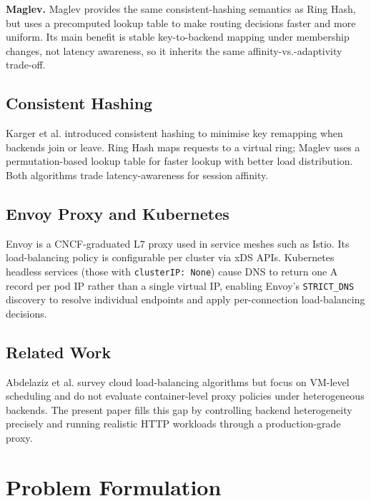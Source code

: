 \documentclass[conference]{IEEEtran}
\begin{document}
\textbf{Maglev.}
Maglev provides the same consistent-hashing semantics as Ring Hash, but uses a
precomputed lookup table to make routing decisions faster and more uniform.
Its main benefit is stable key-to-backend mapping under membership changes, not
latency awareness, so it inherits the same affinity-vs.-adaptivity trade-off.

\subsection{Consistent Hashing}

Karger et al. \cite{karger1997consistent} introduced consistent hashing to
minimise key remapping when backends join or leave.
Ring Hash maps requests to a virtual ring; Maglev \cite{eisenbud2016maglev}
uses a permutation-based lookup table for faster lookup with better load
distribution.
Both algorithms trade latency-awareness for session affinity.

\subsection{Envoy Proxy and Kubernetes}

Envoy \cite{envoyproxy} is a CNCF-graduated L7 proxy used in service meshes
such as Istio.
Its load-balancing policy is configurable per cluster via xDS APIs.
Kubernetes headless services (those with \texttt{clusterIP: None}) cause DNS
to return one A record per pod IP rather than a single virtual IP, enabling
Envoy's \texttt{STRICT\_DNS} discovery to resolve individual endpoints and
apply per-connection load-balancing decisions.

\subsection{Related Work}

Abdelaziz et al. \cite{abdelaziz2020survey} survey cloud load-balancing
algorithms but focus on VM-level scheduling and do not evaluate container-level
proxy policies under heterogeneous backends.
The present paper fills this gap by controlling backend heterogeneity
precisely and running realistic HTTP workloads through a production-grade proxy.

\section{Problem Formulation}
\label{sec:problem}
\end{document}
